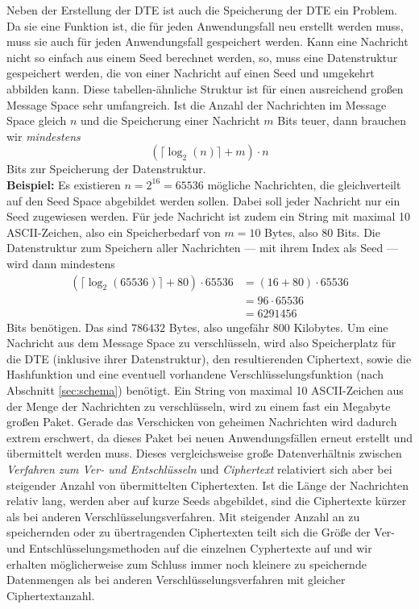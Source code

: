 \documentclass[12pt]{scrartcl}
\begin{document}
Neben der Erstellung der DTE ist auch die Speicherung der DTE ein Problem. Da sie eine Funktion ist, die für jeden Anwendungsfall neu erstellt werden muss, muss sie auch für jeden Anwendungsfall gespeichert werden. Kann eine Nachricht nicht so einfach aus einem Seed berechnet werden, so, muss eine Datenstruktur gespeichert werden, die von einer Nachricht auf einen Seed und umgekehrt abbilden kann. Diese tabellen-ähnliche Struktur ist für einen ausreichend großen Message Space sehr umfangreich. Ist die Anzahl der Nachrichten im Message Space gleich $n$ und die Speicherung einer Nachricht $m$ Bits teuer, dann brauchen wir \emph{mindestens}
$$(\lceil\log_2(n)\rceil + m) \cdot n$$
Bits zur Speicherung der Datenstruktur.\\
\textbf{Beispiel:} Es existieren $n = 2^{16} = 65536$ mögliche Nachrichten, die gleichverteilt auf den Seed Space abgebildet werden sollen. Dabei soll jeder Nachricht nur ein Seed zugewiesen werden. Für jede Nachricht ist zudem ein String mit maximal 10 ASCII-Zeichen, also ein Speicherbedarf von $m = 10$ Bytes, also $80$ Bits. Die Datenstruktur zum Speichern aller Nachrichten --- mit ihrem Index als Seed --- wird dann mindestens
\begin{align*}
(\lceil\log_2(65536)\rceil + 80) \cdot 65536 &= (16 + 80) \cdot 65536\\
&= 96 \cdot 65536\\
&= 6 291 456
\end{align*}
Bits benötigen. Das sind $786 432$ Bytes, also ungefähr 800 Kilobytes. Um eine Nachricht aus dem Message Space zu verschlüsseln, wird also Speicherplatz für die DTE (inklusive ihrer Datenstruktur), den resultierenden Ciphertext, sowie die Hashfunktion und eine eventuell vorhandene Verschlüsselungsfunktion (nach Abschnitt \ref{sec:schema}) benötigt. Ein String von maximal 10 ASCII-Zeichen aus der Menge der Nachrichten zu verschlüsseln, wird zu einem fast ein Megabyte großen Paket. Gerade das Verschicken von geheimen Nachrichten wird dadurch extrem erschwert, da dieses Paket bei neuen Anwendungsfällen erneut erstellt und übermittelt werden muss. Dieses vergleichsweise große Datenverhältnis zwischen \emph{Verfahren zum Ver- und Entschlüsseln} und \emph{Ciphertext} relativiert sich aber bei steigender Anzahl von übermittelten Ciphertexten. Ist die Länge der Nachrichten relativ lang, werden aber auf kurze Seeds abgebildet, sind die Ciphertexte kürzer als bei anderen Verschlüsselungsverfahren. Mit steigender Anzahl an zu speichernden oder zu übertragenden Ciphertexten teilt sich die Größe der Ver- und Entschlüsselungsmethoden auf die einzelnen Cyphertexte auf und wir erhalten möglicherweise zum Schluss immer noch kleinere zu speichernde Datenmengen als bei anderen Verschlüsselungsverfahren mit gleicher Ciphertextanzahl.
\end{document}
